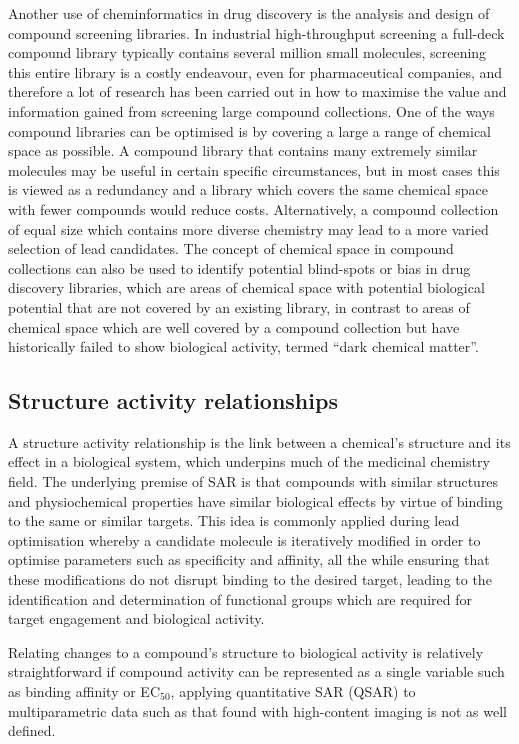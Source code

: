 \documentclass[a4paper,11pt,twoside,openright]{scrbook}
\begin{document}
Another use of cheminformatics in drug discovery is the analysis and design of compound screening libraries.
In industrial high-throughput screening a full-deck compound library typically contains several million small 
molecules, screening this entire library is a costly endeavour, even for pharmaceutical companies, and therefore a lot 
of research has been carried out in how to maximise the value and information gained from screening large compound 
collections.
One of the ways compound libraries can be optimised is by covering a large a range of chemical space as possible.
A compound library that contains many extremely similar molecules may be useful in certain specific circumstances, but 
in most cases this is viewed as a redundancy and a library which covers the same chemical space with fewer compounds 
would reduce costs.
Alternatively, a compound collection of equal size which contains more diverse chemistry may lead to a more varied 
selection of lead candidates. \cite{Clemons2011}
The concept of chemical space in compound collections can also be used to identify potential blind-spots or bias in 
drug discovery libraries, which are areas of chemical space with potential biological potential that are not covered by 
an existing library, in contrast to areas of chemical space which are well covered by a compound collection but have 
historically failed to show biological activity, termed ``dark chemical matter''. \cite{Wassermann2015}


\subsection{Structure activity relationships}

A structure activity relationship is the link between a chemical's structure and its effect in a biological system, 
which underpins much of the medicinal chemistry field.
The underlying premise of SAR is that compounds with similar structures and physiochemical properties have similar 
biological effects by virtue of binding to the same or similar targets.
This idea is commonly applied during lead optimisation whereby a candidate molecule is iteratively modified in order to 
optimise parameters such as specificity and affinity, all the while ensuring that these modifications do not disrupt 
binding to the desired target, leading to the identification and determination of functional groups which are required 
for target engagement and biological activity.

Relating changes to a compound's structure to biological activity is relatively straightforward if compound activity 
can be represented as a single variable such as binding affinity or EC$_{50}$, applying quantitative SAR (QSAR) to 
multiparametric data such as that found with high-content imaging is not as well defined.
\end{document}
